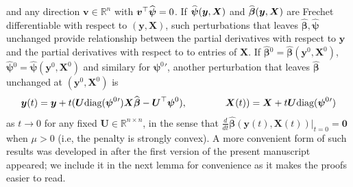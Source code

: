 \documentclass[11pt]{amsart}
\numberwithin{equation}{section}
\numberwithin{equation}{section}
\def\real{{\mathbb{R}}}
\def\R{{\real}}
\def\diag{\hbox{\rm diag}}
\def\mathbold{\boldsymbol} %
\def\bU{\mathbold{U}}\def\hbU{{\widehat{\bU}}}\def\tbU{{\widetilde{\bU}}}
\def\bv{\mathbold{v}}\def\vhat{\widehat{v}}\def\vtil{\widetilde{v}}\def\vbar{{\overline v}}
\def\bX{\mathbold{X}}\def\hbX{{\widehat{\bX}}}\def\tbX{{\widetilde{\bX}}}\def\bXbar{{\overline \bX}}
\def\by{\mathbold{y}}\def\yhat{\widehat{y}}\def\ytil{\widetilde{y}}\def\ybar{{\overline y}}\def\vby{{\bf y}}
\def\bbeta{\mathbold{\beta}}\def\betahat{\widehat{\beta}}\def\hbeta{\widehat{\beta}}
\def\hbbeta{{{\widehat{\bbeta}}}}
\def\bpsi{\mathbold{\psi}}\def\psihat{\widehat{\psi}}\def\hpsi{\widehat{\psi}}
\def\hbpsi{{\widehat{\bpsi}}}\def\tbpsi{{\widetilde{\bpsi}}}
\begin{document}
{and any direction $\bv\in\R^n$ with $\bv^\top\smash{\hbpsi} = 0$.
If $\smash{\hbpsi}(\by,\bX)$ and $\smash{\hbbeta}(\by,\bX)$ are Frechet differentiable
with respect to $(\by,\bX)$, such perturbations that leaves
$\hbbeta,\hbpsi$ unchanged provide relationship
between the partial derivatives with respect to $\by$
and the partial derivatives with respect to to entries of $\bX$.
If $\hbbeta{}^0=\hbbeta(\by^0,\bX^0)$,
$\hbpsi{}^0=\hbpsi(\by^0,\bX^0)$ and similary for $\bpsi^0{}'$,
another perturbation that leaves
$\hbbeta$ unchanged at $(\by^0,\bX^0)$ is
\begin{equation}
\by(t)=
    \by + t(\bU\diag(\bpsi^0{}')\bX\hbbeta-\bU^\top\bpsi^0),
    \qquad
    \qquad
\bX(t))= \bX + t\bU \diag(\bpsi^0{}')
\label{perturationU}
\end{equation}
as $t\to 0$ for any fixed $\bU\in\R^{n\times n}$, in the sense that
$\frac{d}{dt}\hbbeta(\by(t),\bX(t))|_{t=0} = \mathbf 0$ when $\mu>0$
(i.e, the penalty is strongly convex). A more convenient form
of such results was developed in \cite{bellec2021derivatives} after the first version of the present manuscript appeared; we 
include it in the next lemma for convenience as it makes the proofs easier to
read.

}
\end{document}
